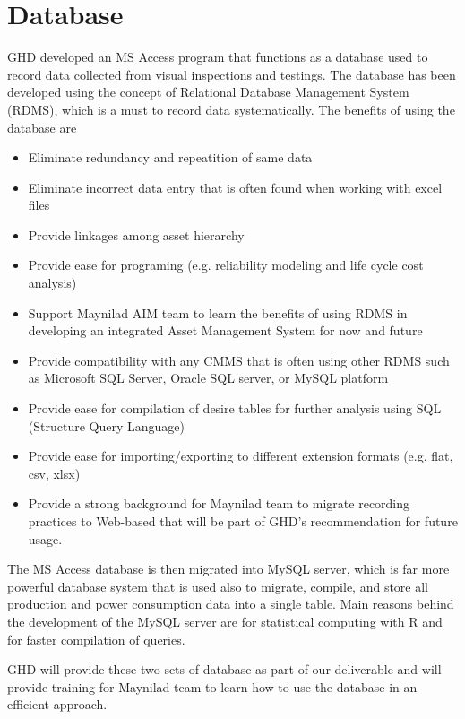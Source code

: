 \section{Database}
\label{24}
GHD developed an MS Access program that functions as a database used to record data collected from visual inspections and testings. The database has been developed using the concept of Relational Database Management System (RDMS), which is a must to record data systematically. The benefits of using the database are

\begin{itemize}
\item Eliminate redundancy and repeatition of same data
\item Eliminate incorrect data entry that is often found when working with excel files
\item Provide linkages among asset hierarchy
\item Provide ease for programing (e.g. reliability modeling and life cycle cost analysis)
\item Support Maynilad AIM team to learn the benefits of using RDMS in developing an integrated Asset Management System for now and future
\item Provide compatibility with any CMMS that is often using other RDMS such as Microsoft SQL Server, Oracle SQL server, or MySQL platform
\item Provide ease for compilation of desire tables for further analysis using SQL (Structure Query Language)
\item Provide ease for importing/exporting to different extension formats (e.g. flat, csv, xlsx)
\item Provide a strong background for Maynilad team to migrate recording practices to Web-based that will be part of GHD's recommendation for future usage.
\end{itemize}

The MS Access database is then migrated into MySQL server, which is far more powerful database system that is used also to migrate, compile, and store all production and power consumption data into a single table. Main reasons behind the development of the MySQL server are for statistical computing with R and for faster compilation of queries.

GHD will provide these two sets of database as part of our deliverable and will provide training for Maynilad team to learn how to use the database in an efficient approach.




